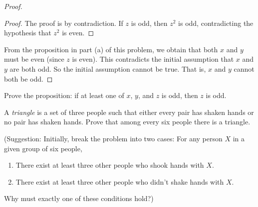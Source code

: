 \documentclass[twoside,12pt]{article}
\begin{document}
\begin{problem}{24}
{\begin{proof}
\begin{proof} The proof is by contradiction.
If $z$ is odd, then $z^2$ is odd, contradicting the hypothesis that $z^2$ is even. 
\end{proof}

From the proposition in part (a) of this problem, we obtain that both $x$ and $y$ must be even (since $z$ is even). This contradicts the initial assumption that $x$ and $y$ are both odd. So the initial assumption cannot be true. That is, $x$ and $y$ cannot both be odd.
\end{proof}
}

 Prove the proposition: if at least one of $x$, $y$, and $z$ is odd, then $z$ is odd.


\eparts
\end{problem}



\begin{problem}{12}
A \textit{triangle} is a set of three people such that either every
pair has shaken hands or no pair has shaken hands.  Prove that among
every six people there is a triangle. 

\noindent(Suggestion: Initially, break the problem into two cases:
%
For any person $X$ in a given group of six people,
\begin{enumerate}
\item There exist at least three other people who shook hands with $X$.
\item There exist at least three other people who didn't shake hands with $X$.
\end{enumerate}
%
Why must exactly one of these conditions hold?)
\end{problem}
\end{document}
